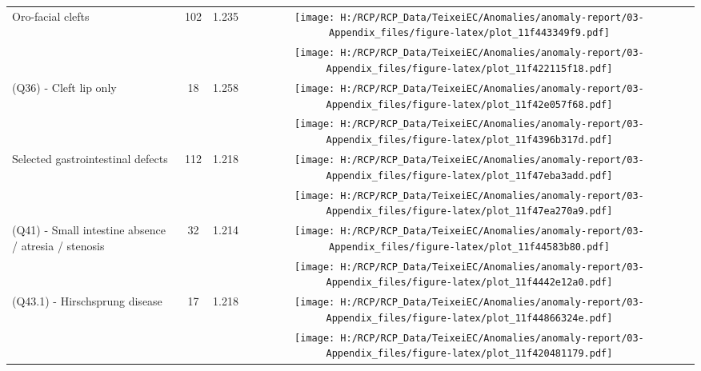 \documentclass[
]{krantz}
\begin{document}
\begin{longtable}[t]{>{\raggedright\arraybackslash}m{4cm}cc>{}c}
Oro-facial clefts & 102 & 1.235 & \texttt{[image: H:/RCP/RCP\_Data/TeixeiEC/Anomalies/anomaly-report/03-Appendix\_files/figure-latex/plot\_11f443349f9.pdf]}\\
\addlinespace
\cellcolor{gray!6}{(Q35) - Cleft palate only} & \cellcolor{gray!6}{67} & \cellcolor{gray!6}{1.231} & \cellcolor{gray!6}{}\texttt{[image: H:/RCP/RCP\_Data/TeixeiEC/Anomalies/anomaly-report/03-Appendix\_files/figure-latex/plot\_11f422115f18.pdf]}\\
(Q36) - Cleft lip only & 18 & 1.258 & \texttt{[image: H:/RCP/RCP\_Data/TeixeiEC/Anomalies/anomaly-report/03-Appendix\_files/figure-latex/plot\_11f42e057f68.pdf]}\\
\cellcolor{gray!6}{(Q37) - Cleft palate with cleft lip} & \cellcolor{gray!6}{39} & \cellcolor{gray!6}{1.231} & \cellcolor{gray!6}{}\texttt{[image: H:/RCP/RCP\_Data/TeixeiEC/Anomalies/anomaly-report/03-Appendix\_files/figure-latex/plot\_11f4396b317d.pdf]}\\
Selected gastrointestinal defects & 112 & 1.218 & \texttt{[image: H:/RCP/RCP\_Data/TeixeiEC/Anomalies/anomaly-report/03-Appendix\_files/figure-latex/plot\_11f47eba3add.pdf]}\\
\cellcolor{gray!6}{(Q39.0-Q39.4) - Oesophageal atresia / stenosis, tracheoesophageal fistula} & \cellcolor{gray!6}{29} & \cellcolor{gray!6}{1.218} & \cellcolor{gray!6}{}\texttt{[image: H:/RCP/RCP\_Data/TeixeiEC/Anomalies/anomaly-report/03-Appendix\_files/figure-latex/plot\_11f47ea270a9.pdf]}\\
\addlinespace
(Q41) - Small intestine absence / atresia / stenosis & 32 & 1.214 & \texttt{[image: H:/RCP/RCP\_Data/TeixeiEC/Anomalies/anomaly-report/03-Appendix\_files/figure-latex/plot\_11f44583b80.pdf]}\\
\cellcolor{gray!6}{(Q42.0-Q42.3) - Ano-rectal absence / atresia / stenosis} & \cellcolor{gray!6}{31} & \cellcolor{gray!6}{1.224} & \cellcolor{gray!6}{}\texttt{[image: H:/RCP/RCP\_Data/TeixeiEC/Anomalies/anomaly-report/03-Appendix\_files/figure-latex/plot\_11f4442e12a0.pdf]}\\
(Q43.1) - Hirschsprung disease & 17 & 1.218 & \texttt{[image: H:/RCP/RCP\_Data/TeixeiEC/Anomalies/anomaly-report/03-Appendix\_files/figure-latex/plot\_11f44866324e.pdf]}\\
\cellcolor{gray!6}{(Q44.2) - Atresia of bile ducts} & \cellcolor{gray!6}{9} & \cellcolor{gray!6}{1.205} & \cellcolor{gray!6}{}\texttt{[image: H:/RCP/RCP\_Data/TeixeiEC/Anomalies/anomaly-report/03-Appendix\_files/figure-latex/plot\_11f420481179.pdf]}\\

\end{longtable}
\end{document}
